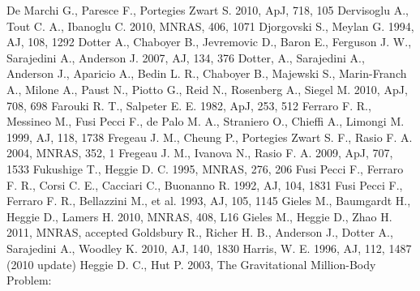 \begin{thebibliography}{99}
 De Marchi G., Paresce F., Portegies
  Zwart S. 2010, ApJ, 718, 105
 Dervisoglu A., Tout C. A., Ibanoglu
  C. 2010, MNRAS, 406, 1071
 Djorgovski S., Meylan G. 1994, AJ,
  108, 1292
  Dotter A., Chaboyer B., Jevremovic D., Baron E., Ferguson J. W.,
  Sarajedini A., Anderson J. 2007, AJ, 134, 376
  Dotter, A., Sarajedini A., Anderson J., Aparicio A., Bedin L. R.,
  Chaboyer B., Majewski S., Marin-Franch A., Milone A., Paust N.,
  Piotto G., Reid  N., Rosenberg A., Siegel M. 2010, ApJ, 708, 698
 Farouki R. T., Salpeter E. E. 1982,
  ApJ, 253, 512
  Ferraro F. R., Messineo M., Fusi Pecci F., de Palo M. A., Straniero
  O., Chieffi A., Limongi M. 1999, AJ, 118, 1738
  Fregeau J. M., Cheung P., Portegies Zwart S. F., Rasio F. A. 2004,
  MNRAS, 352, 1
 Fregeau J. M., Ivanova N., Rasio
  F. A. 2009, ApJ, 707, 1533 
 Fukushige T., Heggie D. C. 1995,
  MNRAS, 276, 206
  Fusi Pecci F., Ferraro F. R., Corsi C. E., Cacciari C., Buonanno
  R. 1992, AJ, 104, 1831
  Fusi Pecci F., Ferraro F. R., Bellazzini M., et al. 1993, AJ, 105, 1145
  Gieles M., Baumgardt H., Heggie D., Lamers H. 2010, MNRAS, 408, L16
  Gieles M., Heggie D., Zhao H. 2011, MNRAS, accepted
  Goldsbury R., Richer H. B., Anderson J., Dotter A., Sarajedini A.,
  Woodley K. 2010, AJ, 140, 1830
  Harris, W. E. 1996, AJ, 112, 1487 (2010 update)
  Heggie D. C., Hut P. 2003, The Gravitational Million-Body Problem:

\end{thebibliography}

